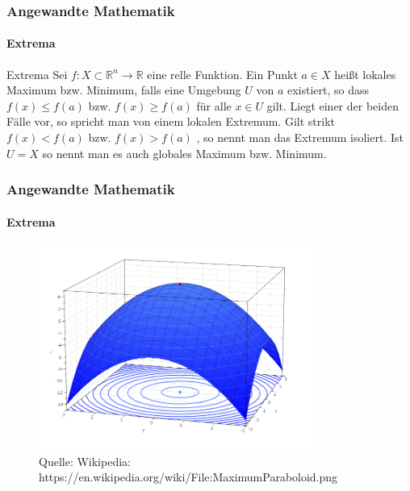 \documentclass{beamer}
\begin{document}
\begin{frame}
    \frametitle{Angewandte Mathematik}
\framesubtitle{Extrema}
    \begin{block}{Extrema}
Sei $f : X \subset \mathbb{R}^n \to \mathbb{R}$ eine relle Funktion.  Ein Punkt $a \in  X$ heißt lokales Maximum bzw. Minimum, falls eine Umgebung $U$ von $a$ existiert, so dass $f(x) \leq f(a)$ bzw.  $f(x) \geq f(a)$ für alle $x \in U$ gilt. Liegt einer der beiden Fälle vor, so spricht man von einem lokalen Extremum. Gilt strikt $f(x) <  f(a)$ bzw.  $f(x) > f(a)$ , so nennt man das Extremum isoliert. Ist $U = X$ so nennt man es auch globales Maximum bzw. Minimum.
\end{block}
 \end{frame}


\begin{frame}
    \frametitle{Angewandte Mathematik}
\framesubtitle{Extrema}

\begin{figure}[H]
      \centering
    \includegraphics[width=0.8\textwidth]{images/MaximumParaboloid}
      \caption{Quelle: Wikipedia: https://en.wikipedia.org/wiki/File:MaximumParaboloid.png}
   \end{figure}
 \end{frame}
\end{document}
